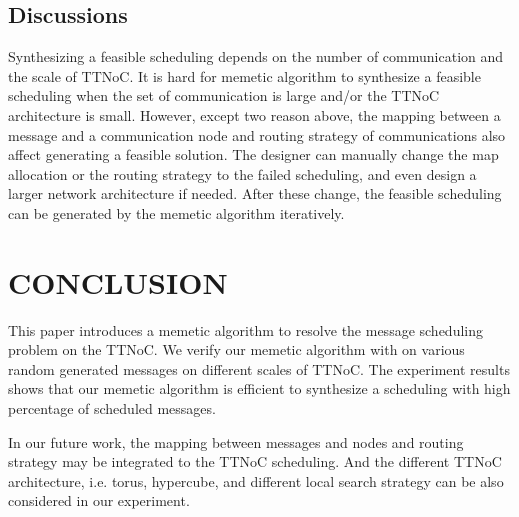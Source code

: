 \documentclass[journal]{IEEEtran}
\theoremstyle{remark}
\begin{document}
\subsection{Discussions}

Synthesizing a feasible scheduling depends on the number of communication and the scale of TTNoC.
It is hard for memetic algorithm to synthesize a feasible scheduling when the set of communication is large and/or the TTNoC architecture is small.
However,
 except two reason above,
  the mapping between a message and a communication node and routing strategy of communications also affect generating a feasible solution.
The designer can manually change the map allocation or the routing strategy to the failed scheduling,
 and even design a larger network architecture if needed.
After these change,
   the feasible scheduling can be generated by the memetic algorithm iteratively. 

\section{CONCLUSION\label{s:conclud}}

This paper introduces a memetic algorithm to resolve the message scheduling problem on the TTNoC.
We verify our memetic algorithm with on various random generated messages on different scales of TTNoC.
The experiment results shows that our memetic algorithm is efficient to synthesize a scheduling with high percentage of scheduled messages.

In our future work,
the mapping between messages and nodes and routing strategy may be integrated to the TTNoC scheduling.
And the different TTNoC architecture,
i.e. torus, hypercube,
and different local search strategy can be also considered in our experiment.











\end{document}
